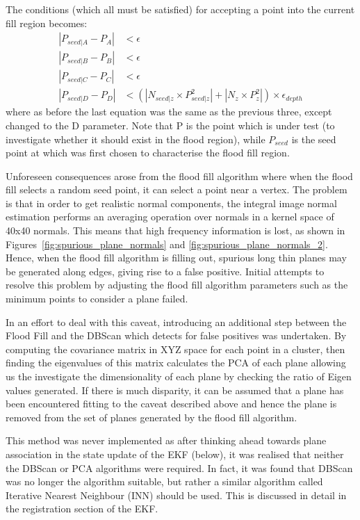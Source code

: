 \documentclass[]{article}
\begin{document}
{The conditions (which all must be satisfied) for accepting a point into the current fill region becomes:
\begin{align}
|P_{seed|A} - P_{A}| &< \epsilon \\
|P_{seed|B} - P_{B}| &< \epsilon\\
|P_{seed|C} - P_{C}| &< \epsilon\\
|P_{seed|D}-P_{D}| &< (|N_{seed|z} \times P^{2}_{seed|z}| + |N_{z} \times P^{2}_{z}|) \times \epsilon_{depth}
\end{align}
where as before the last equation was the same as the previous three, except changed to the D parameter.
Note that P is the point which is under test (to investigate whether it should exist in the flood region), while $P_{seed}$ is the seed point at which was first chosen to characterise the flood fill region. 

Unforeseen consequences arose from the flood fill algorithm where when the flood fill selects a random seed point, it can select a point near a vertex. The problem is that in order to get realistic normal components, the integral image normal estimation performs an averaging operation over normals in a kernel space of 40x40 normals. This means that high frequency information is lost, as shown in Figures~\ref{fig:spurious_plane_normals} and \ref{fig:spurious_plane_normals_2}. Hence, when the flood fill algorithm is filling out, spurious long thin planes may be generated along edges, giving rise to a false positive. Initial attempts to resolve this problem by adjusting the flood fill algorithm parameters such as the minimum points to consider a plane failed.

In an effort to deal with this caveat, introducing an additional step between the Flood Fill and the DBScan which detects for false positives was undertaken. By computing the covariance matrix in XYZ space for each point in a cluster, then finding the eigenvalues of this matrix calculates the PCA of each plane allowing us the investigate the dimensionality of each plane by checking the ratio of Eigen values generated. If there is much disparity, it can be assumed that a plane has been encountered fitting to the caveat described above and hence the plane is removed from the set of planes generated by the flood fill algorithm. 

This method was never implemented as after thinking ahead towards plane association in the state update of the EKF (below), it was realised that neither the DBScan or PCA algorithms were required.  In fact, it was found that DBScan was no longer the algorithm suitable, but rather a similar algorithm called Iterative Nearest Neighbour (INN) should be used. This is discussed in detail in the registration section of the EKF.












}
\end{document}
